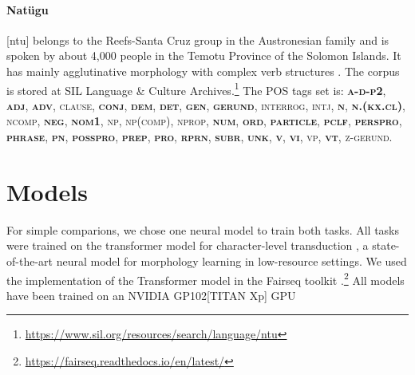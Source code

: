 \paragraph{Natügu} [ntu] belongs to the Reefs-Santa Cruz group in the Austronesian family and is spoken by about 4,000 people in the Temotu Province of the Solomon Islands. It has mainly agglutinative morphology with complex verb structures \cite{naess_ntu_2008}. The corpus is stored at SIL Language \& Culture Archives.\footnote{\url{https://www.sil.org/resources/search/language/ntu}} The POS tags set is: \textsc{\textbf{a-d-p2}, \textbf{adj}, \textbf{adv}, clause, \textbf{conj}, \textbf{dem}, \textbf{det}, \textbf{gen}, \textbf{gerund}, interrog, intj, \textbf{n}, \textbf{n.(kx.cl)}, ncomp, \textbf{neg}, \textbf{nom1}, np, np(comp), nprop, \textbf{num}, \textbf{ord}, \textbf{particle}, \textbf{pclf}, \textbf{perspro}, \textbf{phrase}, \textbf{pn}, \textbf{posspro}, \textbf{prep}, \textbf{pro}, \textbf{rprn}, \textbf{subr}, \textbf{unk}, \textbf{v}, \textbf{vi}, vp, \textbf{vt}, z-gerund}.

%


\section{Models}
\label{sec:models}

For simple comparions, we chose one neural model to train both tasks. All tasks were trained on the transformer model \citep{vaswani_attention_2017} for character-level transduction \citep{wu2020applying}, a state-of-the-art neural model for morphology learning in low-resource settings. We used the implementation of the Transformer model in the Fairseq toolkit \cite{ott-etal-2019-fairseq}.\footnote{\url{https://fairseq.readthedocs.io/en/latest/}} All models have been trained on an NVIDIA GP102[TITAN Xp] GPU


